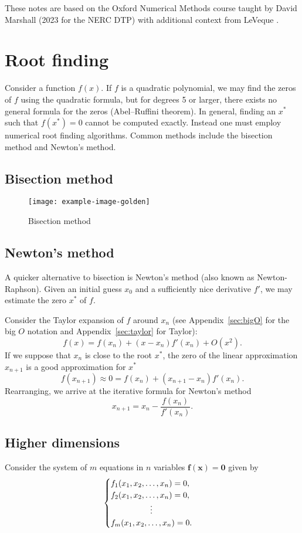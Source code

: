 \documentclass[11pt, a4paper]{article}
\theoremstyle{break}
\newcommand{\ve}{\mathbf} %
\begin{document}
These notes are based on the Oxford Numerical Methods course taught by David Marshall (2023 for the NERC DTP) with additional context from LeVeque \cite{leveque_finite_2007}.
\tableofcontents



\section{Root finding}
Consider a function $f(x)$. If $f$ is a quadratic polynomial, we may find the zeros of $f$ using the quadratic formula, but for degrees 5 or larger, there exists no general formula for the zeros (Abel–Ruffini theorem). In general, finding an $x^*$ such that $f(x^*)=0$ cannot be computed exactly. Instead one must employ numerical root finding algorithms. Common methods include the bisection method and Newton's method.

\subsection{Bisection method}

\begin{figure}[h]\centering
	\texttt{[image: example-image-golden]}
	\caption{Bisection method}
\end{figure}

\subsection{Newton's method}
A quicker alternative to bisection is Newton's method (also known as Newton-Raphson). Given an initial guess $x_0$ and a sufficiently nice derivative $f'$, we may estimate the zero $x^*$ of $f$.

Consider the Taylor expansion of $f$ around $x_n$ (see Appendix~\ref{sec:bigO} for the big $O$ notation and Appendix~\ref{sec:taylor} for Taylor): \[f(x)=f(x_n)+(x-x_n)f'(x_n)+O(x^2).\] If we suppose that $x_n$ is close to the root $x^*$, the zero of the linear approximation $x_{n+1}$ is a good approximation for $x^*$ \[f(x_{n+1})\approx 0=f(x_n)+(x_{n+1}-x_n)f'(x_n).\] Rearranging, we arrive at the iterative formula for Newton's method \begin{equation} x_{n+1} = x_n-\frac{f(x_n)}{f'(x_n)}.\end{equation}

\subsection{Higher dimensions}
Consider the system of $m$ equations in $n$ variables $\ve{f}(\ve x)=\ve 0$ given by \[\begin{cases} f_1(x_1,x_2, \ldots, x_n) =0,\\f_2(x_1,x_2,\ldots, x_n)=0, \\\hfil\vdots\\ f_m(x_1,x_2,\ldots,x_n)=0.\end{cases}\]
\end{document}
